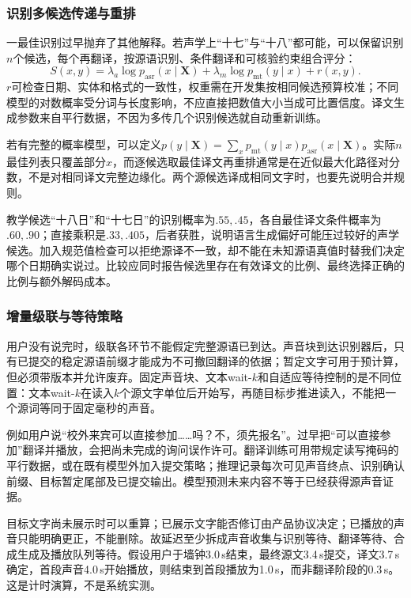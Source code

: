 \subsubsection{识别多候选传递与重排}
\label{sec:nlp-speech-nbest-translation}

一最佳识别过早抛弃了其他解释。若声学上“十七”与“十八”都可能，可以保留识别$n$个候选，每个再翻译，按源语识别、条件翻译和可核验约束组合评分：
\begin{equation}
 S(x,y)=\lambda_a\log p_{\mathrm{asr}}(x\mid\bm{X})
        +\lambda_m\log p_{\mathrm{mt}}(y\mid x)+r(x,y).
 \label{eq:nlp-speech-nbest}
\end{equation}
$r$可检查日期、实体和格式的一致性，权重需在开发集按相同候选预算校准；不同模型的对数概率受分词与长度影响，不应直接把数值大小当成可比置信度。译文生成参数来自平行数据，不因为多传几个识别候选就自动重新训练。

若有完整的概率模型，可以定义$p(y\mid\bm{X})=\sum_xp_{\mathrm{mt}}(y\mid x)p_{\mathrm{asr}}(x\mid\bm{X})$。实际$n$最佳列表只覆盖部分$x$，而逐候选取最佳译文再重排通常是在近似最大化路径对分数，不是对相同译文完整边缘化。两个源候选译成相同文字时，也要先说明合并规则。

教学候选“十八日”和“十七日”的识别概率为$.55,.45$，各自最佳译文条件概率为$.60,.90$；直接乘积是$.33,.405$，后者获胜，说明语言生成偏好可能压过较好的声学候选。加入规范值检查可以拒绝源译不一致，却不能在未知源语真值时替我们决定哪个日期确实说过。比较应同时报告候选里存在有效译文的比例、最终选择正确的比例与额外解码成本。

\subsubsection{增量级联与等待策略}
\label{sec:nlp-speech-incremental-cascade}

用户没有说完时，级联各环节不能假定完整源语已到达。声音块到达识别器后，只有已提交的稳定源语前缀才能成为不可撤回翻译的依据；暂定文字可用于预计算，但必须带版本并允许废弃。固定声音块、文本wait-$k$和自适应等待控制的是不同位置：文本wait-$k$在读入$k$个源文字单位后开始写，再随目标步推进读入，不能把一个源词等同于固定毫秒的声音。

例如用户说“校外来宾可以直接参加……吗？不，须先报名”。过早把“可以直接参加”翻译并播放，会把尚未完成的询问误作许可。翻译训练可用带规定读写掩码的平行数据，或在既有模型外加入提交策略；推理记录每次可见声音终点、识别确认前缀、目标暂定尾部及已提交输出。模型预测未来内容不等于已经获得源声音证据。

目标文字尚未展示时可以重算；已展示文字能否修订由产品协议决定；已播放的声音只能明确更正，不能删除。故延迟至少拆成声音收集与识别等待、翻译等待、合成生成及播放队列等待。假设用户于墙钟3.0\,s结束，最终源文3.4\,s提交，译文3.7\,s确定，首段声音4.0\,s开始播放，则结束到首段播放为1.0\,s，而非翻译阶段的0.3\,s。这是计时演算，不是系统实测。


